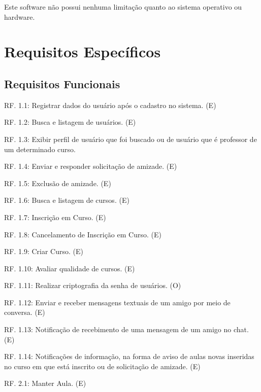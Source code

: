 \documentclass[12pt,a4paper,onecolumn,titlepage]{article}
\begin{document}
Este software não possui nenhuma limitação quanto ao sistema operativo ou hardware.

\section{Requisitos Específicos}
\label{sect:requisitos}



\subsection{Requisitos Funcionais}


RF. 1.1: Registrar dados do usuário após o cadastro no sistema. (E)

RF. 1.2: Busca e listagem de usuários. (E)

RF. 1.3: Exibir perfil de usuário que foi buscado ou de usuário que é professor de um determinado curso.

RF. 1.4: Enviar e responder solicitação de amizade. (E)

RF. 1.5: Exclusão de amizade. (E)

RF. 1.6: Busca e listagem de cursos. (E)

RF. 1.7: Inscrição em Curso. (E)

RF. 1.8: Cancelamento de Inscrição em Curso. (E)

RF. 1.9: Criar Curso. (E)

RF. 1.10: Avaliar qualidade de cursos. (E)

RF. 1.11: Realizar criptografia da senha de usuários. (O)

RF. 1.12: Enviar e receber mensagens textuais de um amigo por meio de conversa. (E)

RF. 1.13: Notificação de recebimento de uma mensagem de um amigo no chat. (E)

RF. 1.14: Notificações de informação, na forma de aviso de aulas novas inseridas no curso em que está inscrito ou de solicitação de amizade. (E)

RF. 2.1: Manter Aula. (E)
\end{document}
